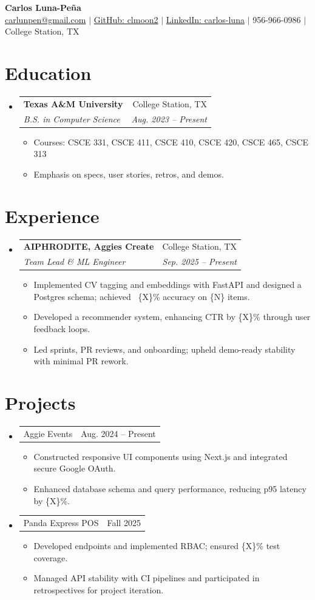 \documentclass[letterpaper,11pt]{article}
\makeatletter
\newcommand{\resumeItem}[1]{
  \item\small{{#1 \vspace{-2pt}}}
}
\newcommand{\resumeSubheading}[4]{
  \vspace{-2pt}\item
  \begin{tabular*}{0.97\textwidth}[t]{l@{\extracolsep{\fill}}r}
  \textbf{#1} & #2 \\
  \textit{\small#3} & \textit{\small #4} \\
  \end{tabular*}\vspace{-7pt}
}
\newcommand{\resumeProjectHeading}[2]{
  \item
  \begin{tabular*}{0.97\textwidth}{l@{\extracolsep{\fill}}r}
  \small#1 & #2 \\
  \end{tabular*}\vspace{-7pt}
}
\newcommand{\resumeSubHeadingListStart}{\begin{itemize}[leftmargin=0.15in, label={}]}
\newcommand{\resumeSubHeadingListEnd}{\end{itemize}}
\newcommand{\resumeItemListStart}{\begin{itemize}}
\newcommand{\resumeItemListEnd}{\end{itemize}\vspace{-5pt}}
\makeatother
\begin{document}
\begin{center}
    \textbf{\Huge Carlos Luna-Pe\~na} \\
    \vspace{1pt}
    \small \href{mailto:carlunpen@gmail.com}{carlunpen@gmail.com} 
    $|$ \href{https://github.com/clmoon2}{GitHub: clmoon2} 
    $|$ \href{https://linkedin.com/in/carlos-luna}{LinkedIn: carlos-luna} 
    $|$ 956-966-0986 
    $|$ College Station, TX
\end{center}

\vspace{-8pt}
\section{Education}
  \resumeSubHeadingListStart
    \resumeSubheading
      {Texas A\&M University}{College Station, TX}
      {B.S. in Computer Science}{Aug. 2023 -- Present}
      \resumeItemListStart
        \resumeItem{Courses: CSCE 331, CSCE 411, CSCE 410, CSCE 420, CSCE 465, CSCE 313}
        \resumeItem{Emphasis on specs, user stories, retros, and demos.}
      \resumeItemListEnd
  \resumeSubHeadingListEnd

\vspace{-8pt}
\section{Experience}
  \resumeSubHeadingListStart
    \resumeSubheading
      {AIPHRODITE, Aggies Create}{College Station, TX}
      {Team Lead \& ML Engineer}{Sep. 2025 -- Present}
      \resumeItemListStart
        \resumeItem{Implemented CV tagging and embeddings with FastAPI and designed a Postgres schema; achieved ~\{X\}\% accuracy on \{N\} items.}
        \resumeItem{Developed a recommender system, enhancing CTR by \{X\}\% through user feedback loops.}
        \resumeItem{Led sprints, PR reviews, and onboarding; upheld demo-ready stability with minimal PR rework.}
      \resumeItemListEnd
  \resumeSubHeadingListEnd

\vspace{-8pt}
\section{Projects}
  \resumeSubHeadingListStart
    \resumeProjectHeading
      {Aggie Events}{Aug. 2024 -- Present}
      \resumeItemListStart
        \resumeItem{Constructed responsive UI components using Next.js and integrated secure Google OAuth.}
        \resumeItem{Enhanced database schema and query performance, reducing p95 latency by \{X\}\%.}
      \resumeItemListEnd
    \resumeProjectHeading
      {Panda Express POS}{Fall 2025}
      \resumeItemListStart
        \resumeItem{Developed endpoints and implemented RBAC; ensured \{X\}\% test coverage.}
        \resumeItem{Managed API stability with CI pipelines and participated in retrospectives for project iteration.}
      \resumeItemListEnd
  \resumeSubHeadingListEnd
  
\end{document}
